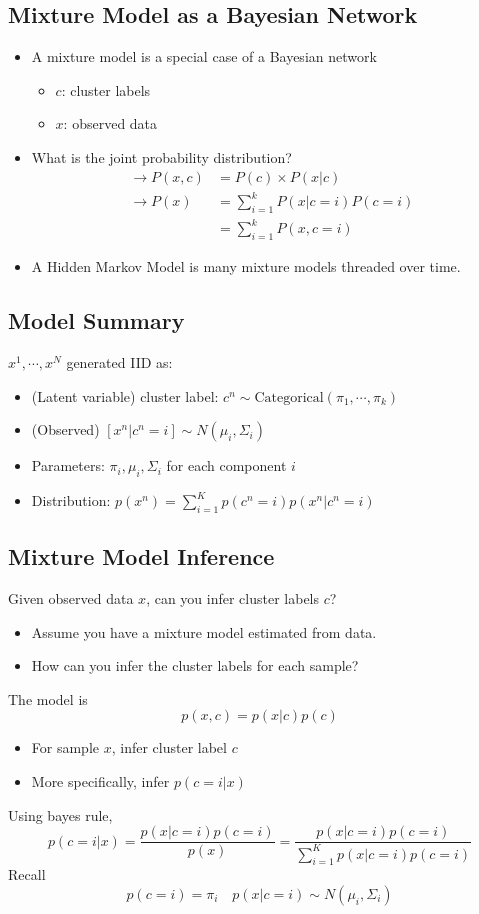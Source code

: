 \documentclass[10pt]{article}
\begin{document}
\subsection*{Mixture Model as a Bayesian Network}
\begin{itemize}
	\item A mixture model is a special case of a Bayesian network
	\begin{itemize}
	    \item $c$: cluster labels
	    \item $x$: observed data
    \end{itemize}
    \item What is the joint probability distribution?
    \begin{align*}
        \rightarrow P(x, c) &= P(c) \times P(x | c) \\
        \rightarrow P(x) &= \sum_{i = 1}^k P(x | c = i) P(c = i) \\
        &= \sum_{i = 1}^k P(x, c = i)
    \end{align*}
    \item A Hidden Markov Model is many mixture models threaded over time.
\end{itemize}

\subsection*{Model Summary}
$x^1, \cdots, x^N$ generated IID as:
\begin{itemize}
	\item (Latent variable) cluster label: $c^n \sim \text{Categorical}(\pi_1, \cdots, \pi_k)$
	\item (Observed) $[x^n | c^n = i] \sim N(\mu_i, \Sigma_i)$
	\item Parameters: $\pi_i, \mu_i, \Sigma_i$ for each component $i$
	\item Distribution: $p(x^n) = \sum_{i = 1}^K p(c^n = i) p(x^n | c^n = i)$
\end{itemize}

\subsection*{Mixture Model Inference}
Given observed data $x$, can you infer cluster labels $c$?
\begin{itemize}
	\item Assume you have a mixture model estimated from data.
	\item How can you infer the cluster labels for each sample?
\end{itemize}
The model is
\[p(x, c) = p(x | c) p(c)\]
\begin{itemize}
	\item For sample $x$, infer cluster label $c$
	\item More specifically, infer $p(c = i | x)$
\end{itemize}
Using bayes rule,
\[p(c = i | x) = \frac{p(x | c = i) p(c = i)}{p(x)} = \frac{p(x | c = i) p(c = i)}{\sum_{i = 1}^K p(x | c = i) p(c = i)}\]
Recall
\[p(c = i) = \pi_i \quad p(x | c = i) \sim N(\mu_i, \Sigma_i)\]
\end{document}
